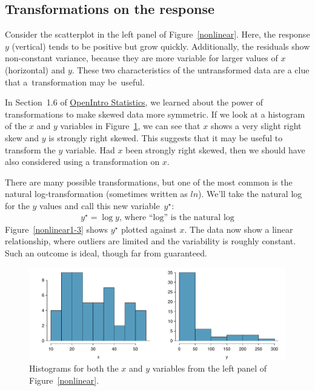 \subsection{Transformations on the response}

Consider the scatterplot in the left panel of Figure~\ref{nonlinear}. Here, the response $y$ (vertical) tends to be positive but grow quickly. Additionally, the residuals show non-constant variance, because they are more variable for larger values of $x$ (horizontal) and $y$. These two characteristics of the untransformed data are a clue that a~transformation may be~useful.

In Section~1.6 of \href{http://www.openintro.org/stat/textbook.php}{OpenIntro Statistics}, we learned about the power of transformations to make skewed data more symmetric. If we look at a histogram of the $x$ and $y$ variables in Figure~\ref{nonlinear1-2}, we can see that $x$ shows a very slight right skew and $y$ is strongly right skewed. This suggests that it may be useful to transform the $y$ variable. Had $x$ been strongly right skewed, then we should have also considered using a transformation on $x$.

There are many possible transformations, but one of the most common is the natural log-transformation (sometimes written as $ln$). We'll take the natural log for the $y$ values and call this new variable~$y^\star$:
\begin{align*}
y^\star = \log y\text{, where ``log'' is the natural log}
\end{align*}
Figure~\ref{nonlinear1-3} shows $y^\star$ plotted against $x$. The data now show a linear relationship, where outliers are limited and the variability is roughly constant. Such an outcome is ideal, though far from guaranteed.

\begin{figure}
\centering
\includegraphics[width=\textwidth]{RegressionExtras/figures/nonlinear/nonlinear1-2}
\caption{Histograms for both the $x$ and $y$ variables from the left panel of Figure~\ref{nonlinear}.}
\label{nonlinear1-2}
\end{figure}

